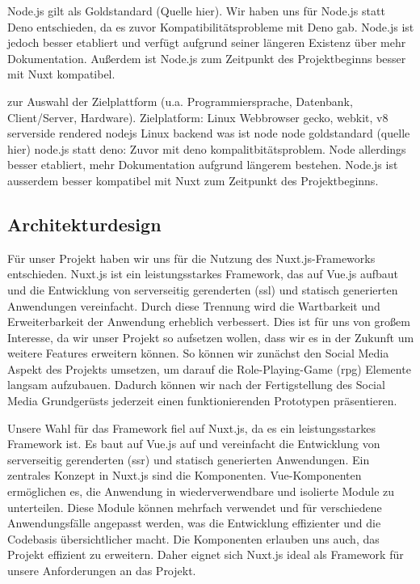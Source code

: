 \documentclass[a4paper,12pt]{article}
\begin{document}
Node.js gilt als Goldstandard (Quelle hier). Wir haben uns für Node.js statt Deno entschieden, da es zuvor Kompatibilitätsprobleme mit Deno gab. Node.js ist jedoch besser etabliert und verfügt aufgrund seiner längeren Existenz über mehr Dokumentation. Außerdem ist Node.js zum Zeitpunkt des Projektbeginns besser mit Nuxt kompatibel.


zur Auswahl der Zielplattform (u.a. Programmiersprache, Datenbank,
Client/Server, Hardware).
Zielplatform: Linux
Webbrowser
gecko, webkit, v8 serverside rendered
nodejs Linux backend
was ist node node goldstandard (quelle hier)
node.js statt deno: Zuvor mit deno kompalitbitätsproblem. Node allerdings besser etabliert, mehr Dokumentation aufgrund längerem bestehen. Node.js ist ausserdem besser kompatibel mit Nuxt zum Zeitpunkt des Projektbeginns.


\subsection{Architekturdesign}
Für unser Projekt haben wir uns für die Nutzung des Nuxt.js-Frameworks entschieden. Nuxt.js ist ein leistungsstarkes Framework, das auf Vue.js aufbaut und die Entwicklung von serverseitig gerenderten (\gls{ssl}) und statisch generierten Anwendungen vereinfacht. Durch diese Trennung wird die Wartbarkeit und Erweiterbarkeit der Anwendung erheblich verbessert. Dies ist für uns von großem Interesse, da wir unser Projekt so aufsetzen wollen, dass wir es in der Zukunft um weitere Features erweitern können. So können wir zunächst den Social Media Aspekt des Projekts umsetzen, um darauf die Role-Playing-Game (\gls{rpg}) Elemente langsam aufzubauen. Dadurch können wir nach der Fertigstellung des Social Media Grundgerüsts jederzeit einen funktionierenden Prototypen präsentieren.

Unsere Wahl für das Framework fiel auf Nuxt.js, da es ein leistungsstarkes Framework ist. Es baut auf Vue.js auf und vereinfacht die Entwicklung von serverseitig gerenderten (\gls{ssr}) und statisch generierten Anwendungen. Ein zentrales Konzept in Nuxt.js sind die Komponenten. Vue-Komponenten ermöglichen es, die Anwendung in wiederverwendbare und isolierte Module zu unterteilen. Diese Module können mehrfach verwendet und für verschiedene Anwendungsfälle angepasst werden, was die Entwicklung effizienter und die Codebasis übersichtlicher macht. Die Komponenten erlauben uns auch, das Projekt effizient zu erweitern. Daher eignet sich Nuxt.js ideal als Framework für unsere Anforderungen an das Projekt.
\end{document}
